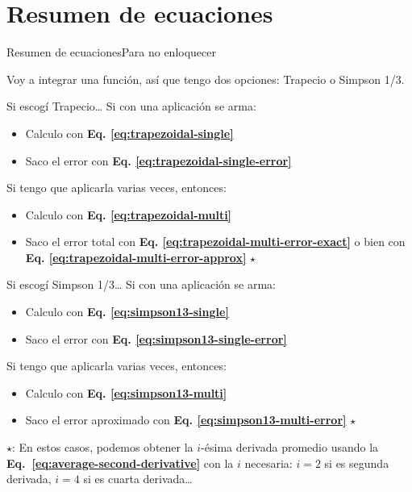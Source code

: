 \documentclass[spanish, c, dvipsnames]{beamer}
\newcommand{\contrastA}[1]{{\color{red} #1}}
\newcommand{\contrastB}[1]{{\color{blue} #1}}
\begin{document}
\section{Resumen de ecuaciones}

\begin{frame}[allowframebreaks]{Resumen de ecuaciones}{Para no enloquecer}

Voy a integrar una función, así que tengo dos opciones: \contrastA{Trapecio} o \contrastB{Simpson 1/3}.

\begin{alertblock}{Si escogí Trapecio\dots}
    Si con una aplicación se arma:
    \begin{itemize}
        \item Calculo con \textbf{Eq. \ref{eq:trapezoidal-single}}
        \item Saco el error con \textbf{Eq. \ref{eq:trapezoidal-single-error}}
    \end{itemize}
    Si tengo que aplicarla varias veces, entonces:
    \begin{itemize}
        \item Calculo con \textbf{Eq. \ref{eq:trapezoidal-multi}}
        \item Saco el error total con \textbf{Eq. \ref{eq:trapezoidal-multi-error-exact}} o bien con \textbf{Eq. \ref{eq:trapezoidal-multi-error-approx}} $\star$
    \end{itemize}
\end{alertblock}

\begin{block}{Si escogí Simpson 1/3\dots}
    Si con una aplicación se arma:
    \begin{itemize}
        \item Calculo con \textbf{Eq. \ref{eq:simpson13-single}}
        \item Saco el error con \textbf{Eq. \ref{eq:simpson13-single-error}}
    \end{itemize}
    Si tengo que aplicarla varias veces, entonces:
    \begin{itemize}
        \item Calculo con \textbf{Eq. \ref{eq:simpson13-multi}}
        \item Saco el error aproximado con \textbf{Eq. \ref{eq:simpson13-multi-error}} $\star$
    \end{itemize}
\end{block}

\bigskip

$\star$: En estos casos, podemos obtener la $i$-ésima derivada promedio usando la \textbf{Eq.~\ref{eq:average-second-derivative}} con la $i$ necesaria: $i=2$ si es segunda derivada, $i=4$ si es cuarta derivada\dots

\end{frame}
\end{document}
